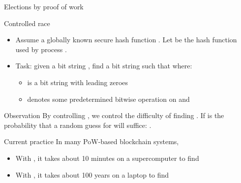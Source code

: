 \begin{frame}{Elections by proof of work}
  \begin{block}{Controlled race}
    \begin{itemize}
      \item Assume a globally known secure hash function . Let  be the hash function
            used by process .
      \item Task: given a bit string , find a bit string  such that
             where:
            \begin{itemize}
              \item {} is a bit string with  leading zeroes
              \item {} denotes some predetermined bitwise operation on 
                    and 
            \end{itemize}
    \end{itemize}
  \end{block}

  \begin{alertblock}{Observation}
    By controlling , we control the difficulty of finding . If 
    is the probability that a random guess for  will suffice: .
  \end{alertblock}

  \begin{block}{Current practice}
    In many PoW-based blockchain systems, 
    \begin{itemize}%
      \item With , it takes about 10 minutes on a supercomputer to find 
      \item With , it takes about 100 years on a laptop to find 
    \end{itemize}
  \end{block}
\end{frame}
